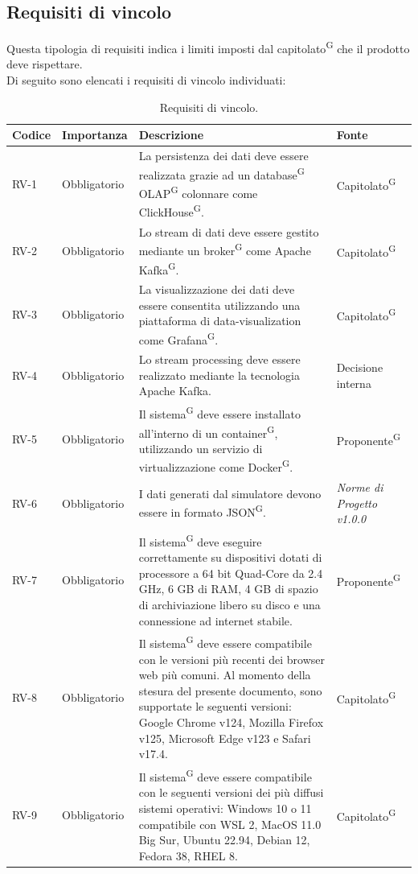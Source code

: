 \documentclass[8pt]{article}
\newcommand{\glossterm}[1]{#1\textsuperscript{G}} %
\begin{document}
\subsection{Requisiti di vincolo}
Questa tipologia di requisiti indica i limiti imposti dal \glossterm{capitolato} che il prodotto deve rispettare. \\
Di seguito sono elencati i requisiti di vincolo individuati:
\begin{longtable}{|>{\centering\arraybackslash}p{1.2cm}|>{\centering\arraybackslash}p{2cm}|>{\centering\arraybackslash}p{8.5cm}|>{\centering\arraybackslash}p{3cm}|}
    \hline
    \rowcolor{white}
    \textbf{Codice} & \textbf{Importanza} & \textbf{Descrizione} & \textbf{Fonte} \\
		\hline
    \endfirsthead
    \rowcolor{white}
    \caption{Requisiti di vincolo.}
	\label{table:Requisiti di vincolo}
    \endlastfoot
            RV-1 & Obbligatorio & La persistenza dei dati deve essere realizzata grazie ad un \glossterm{database} \glossterm{OLAP} colonnare come \glossterm{ClickHouse}. & \glossterm{Capitolato} \\ \hline
            RV-2 & Obbligatorio & Lo stream di dati deve essere gestito mediante un \glossterm{broker} come Apache \glossterm{Kafka}. & \glossterm{Capitolato} \\ \hline
            RV-3 & Obbligatorio & La visualizzazione dei dati deve essere consentita utilizzando una piattaforma di data-visualization come \glossterm{Grafana}. & \glossterm{Capitolato} \\ \hline
            RV-4 & Obbligatorio & Lo stream processing deve essere realizzato mediante la tecnologia Apache Kafka. & Decisione interna \\ \hline
            RV-5 & Obbligatorio & Il \glossterm{sistema} deve essere installato all'interno di un \glossterm{container}, utilizzando un servizio di virtualizzazione come \glossterm{Docker}. & \glossterm{Proponente} \\ \hline
            RV-6 & Obbligatorio & I dati generati dal simulatore devono essere in formato \glossterm{JSON}. & \textit{Norme di Progetto v1.0.0} \\ \hline
            RV-7 & Obbligatorio & Il \glossterm{sistema} deve eseguire correttamente su dispositivi dotati di processore a 64 bit Quad-Core da 2.4 GHz, 6 GB di RAM, 4 GB di spazio di archiviazione libero su disco e una connessione ad internet stabile. & \glossterm{Proponente} \\ \hline
            RV-8 & Obbligatorio & Il \glossterm{sistema} deve essere compatibile con le versioni più recenti dei browser web più comuni. Al momento della stesura del presente documento, sono supportate le seguenti versioni: Google Chrome v124, Mozilla Firefox v125, Microsoft Edge v123 e Safari v17.4. & \glossterm{Capitolato} \\ \hline
            RV-9 & Obbligatorio & Il \glossterm{sistema} deve essere compatibile con le seguenti versioni dei più diffusi sistemi operativi: Windows 10 o 11 compatibile con WSL 2, MacOS 11.0 Big Sur, Ubuntu 22.94, Debian 12, Fedora 38, RHEL 8. & \glossterm{Capitolato} \\ \hline
\end{longtable}
\clearpage
\end{document}
